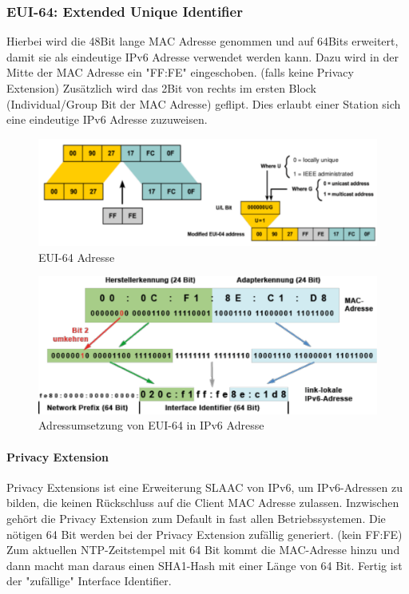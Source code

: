\subsubsection{EUI-64: Extended Unique Identifier}
Hierbei wird die 48Bit lange MAC Adresse genommen und auf 64Bits erweitert, damit sie als eindeutige IPv6 Adresse verwendet werden kann. Dazu wird in der Mitte der MAC Adresse ein "FF:FE" eingeschoben. (falls keine Privacy Extension) Zusätzlich wird das 2Bit von rechts im ersten Block (Individual/Group Bit der MAC Adresse) geflipt. Dies erlaubt einer Station sich eine eindeutige IPv6 Adresse zuzuweisen. 
\begin{figure}[h]
	\centering
	\includegraphics[width=0.7\linewidth]{images/eui-64.pdf}
	\caption{EUI-64 Adresse}
\end{figure}

\begin{figure}[h]
	\centering
	\includegraphics[width=0.7\linewidth]{images/mac_ipv6.pdf}
	\caption{Adressumsetzung von EUI-64 in IPv6 Adresse}
\end{figure}

\paragraph{Privacy Extension}
Privacy Extensions ist eine Erweiterung SLAAC von IPv6, um IPv6-Adressen zu bilden, die keinen Rückschluss auf die Client MAC Adresse zulassen. Inzwischen gehört die Privacy Extension zum Default in fast allen Betriebssystemen. Die nötigen 64 Bit werden bei der Privacy Extension zufällig generiert. (kein FF:FE) Zum aktuellen NTP-Zeitstempel mit 64 Bit kommt die MAC-Adresse hinzu und dann macht man daraus einen SHA1-Hash mit einer Länge von 64 Bit. Fertig ist der "zufällige" Interface Identifier.


